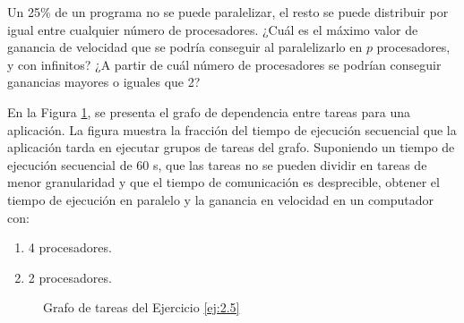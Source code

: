 \begin{ejercicio}
    Un 25\% de un programa no se puede paralelizar, el resto se puede distribuir por igual entre
    cualquier número de procesadores. ¿Cuál es el máximo valor de ganancia de velocidad que se podría
    conseguir al paralelizarlo en $p$ procesadores, y con infinitos? ¿A partir de cuál número de procesadores se
    podrían conseguir ganancias mayores o iguales que 2?
\end{ejercicio}

\begin{ejercicio}\label{ej:2.5}
    
    En la Figura \ref{fig:Grafo_2.5}, se presenta el grafo de dependencia entre tareas para una aplicación.
    La figura muestra la fracción del tiempo de ejecución secuencial que la aplicación tarda en ejecutar grupos de tareas del grafo.
    Suponiendo un tiempo de ejecución secuencial de 60 s, que las tareas no se pueden dividir en tareas de menor granularidad y
    que el tiempo de comunicación es desprecible, obtener el tiempo de ejecución en paralelo y la ganancia en velocidad en un computador con:
    \begin{enumerate}
        \item 4 procesadores.
        \item 2 procesadores.
    \end{enumerate}
    \begin{figure}
        \centering
        \caption{Grafo de tareas del Ejercicio \ref{ej:2.5}}
        \label{fig:Grafo_2.5}
    \end{figure}
\end{ejercicio}



